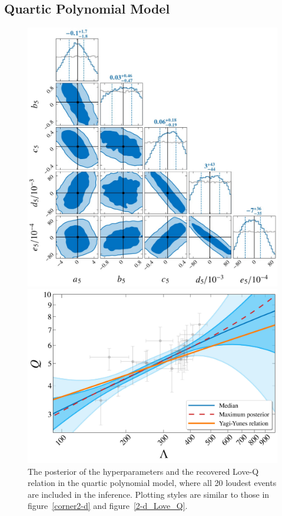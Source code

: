 \documentclass[a4paper,11pt]{article}
\begin{document}
\subsection{Quartic Polynomial Model}
\label{subsec:results_quartic}

\begin{figure}
\begin{minipage}[t]{0.49\textwidth}
\centering
\includegraphics[width=0.8\linewidth]{fig_Hyper_parameter_5d.pdf}%
\end{minipage}
\hfill
\begin{minipage}[t]{0.49\textwidth}
\includegraphics[width=\linewidth]{fig_hierarchical_results_APR4_5d.pdf}
\end{minipage}
    \caption{The posterior of the hyperparameters and the recovered Love-Q relation
    in the quartic polynomial model, where all 20 loudest events are included in
    the inference. Plotting styles are similar to those in figure~\ref{corner2-d} and
    figure~\ref{2-d_Love_Q}.
    } \label{5-d_Love_Q} 
\end{figure}
\end{document}
